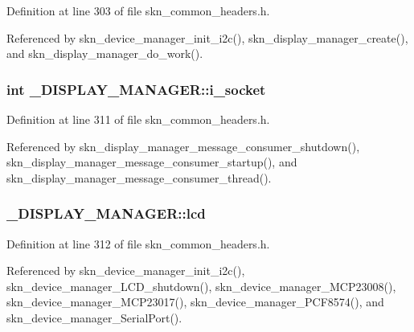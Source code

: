 Definition at line 303 of file skn\+\_\+common\+\_\+headers.\+h.



Referenced by skn\+\_\+device\+\_\+manager\+\_\+init\+\_\+i2c(), skn\+\_\+display\+\_\+manager\+\_\+create(), and skn\+\_\+display\+\_\+manager\+\_\+do\+\_\+work().

\hypertarget{struct___d_i_s_p_l_a_y___m_a_n_a_g_e_r_a23e726562acd51d59c09eafa6f179137}{}
\subsubsection[{i\+\_\+socket}]{\setlength{\rightskip}{0pt plus 5cm}int \+\_\+\+D\+I\+S\+P\+L\+A\+Y\+\_\+\+M\+A\+N\+A\+G\+E\+R\+::i\+\_\+socket}\label{struct___d_i_s_p_l_a_y___m_a_n_a_g_e_r_a23e726562acd51d59c09eafa6f179137}


Definition at line 311 of file skn\+\_\+common\+\_\+headers.\+h.



Referenced by skn\+\_\+display\+\_\+manager\+\_\+message\+\_\+consumer\+\_\+shutdown(), skn\+\_\+display\+\_\+manager\+\_\+message\+\_\+consumer\+\_\+startup(), and skn\+\_\+display\+\_\+manager\+\_\+message\+\_\+consumer\+\_\+thread().

\hypertarget{struct___d_i_s_p_l_a_y___m_a_n_a_g_e_r_a182e9fb6ca9f11b3e0a35628123d46f5}{}
\subsubsection[{lcd}]{ \+\_\+\+D\+I\+S\+P\+L\+A\+Y\+\_\+\+M\+A\+N\+A\+G\+E\+R\+::lcd}\label{struct___d_i_s_p_l_a_y___m_a_n_a_g_e_r_a182e9fb6ca9f11b3e0a35628123d46f5}


Definition at line 312 of file skn\+\_\+common\+\_\+headers.\+h.



Referenced by skn\+\_\+device\+\_\+manager\+\_\+init\+\_\+i2c(), skn\+\_\+device\+\_\+manager\+\_\+\+L\+C\+D\+\_\+shutdown(), skn\+\_\+device\+\_\+manager\+\_\+\+M\+C\+P23008(), skn\+\_\+device\+\_\+manager\+\_\+\+M\+C\+P23017(), skn\+\_\+device\+\_\+manager\+\_\+\+P\+C\+F8574(), and skn\+\_\+device\+\_\+manager\+\_\+\+Serial\+Port().

